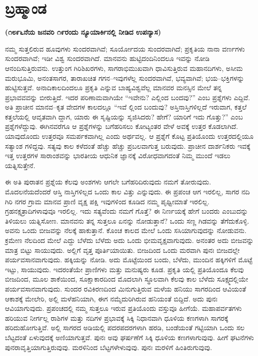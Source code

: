 \chapter{ಬ್ರಹ್ಮಾಂಡ}

\centerline{\textbf{(೧೮೯೬ನೆಯ ಜನವರಿ ೧೯ರಂದು ನ್ಯೂಯಾರ್ಕಿನಲ್ಲಿ ನೀಡಿದ ಉಪನ್ಯಾಸ)}}

ನಮ್ಮ ಸುತ್ತಲಿರುವ ಹೂವುಗಳು ಸುಂದರವಾಗಿವೆ; ಸೂರ್ಯೋದಯ ಸುಂದರವಾಗಿದೆ; ಪ್ರಕೃತಿಯ ನಾನಾ ವರ್ಣಗಳು ಸುಂದರವಾಗಿವೆ; ಇಡೀ ವಿಶ್ವ ಸುಂದರವಾಗಿದೆ. ಮಾನವನು ಹುಟ್ಟಿದಂದಿನಿಂದಲೂ ಇವನ್ನು ನೋಡಿ ಆನಂದಿಸುತ್ತಿರುವನು. ಉತ್ತುಂಗ ಗಿರಿಶಿಖರಗಳು, ಸಾಗರಾಭಿಮುಖವಾಗಿ ಧಾವಿಸುತ್ತಿರುವ ಮಹಾನದಿಗಳು, ಅಸೀಮ ಮರುಭೂಮಿ, ಅನಂತಸಾಗರ, ತಾರಾಖಚಿತ ಗಗನ–ಇವುಗಳೆಲ್ಲ ಸುಂದರವಾಗಿವೆ, ಭವ್ಯವಾಗಿವೆ; ಭಯ–ಭಕ್ತಿಗಳನ್ನು ಹುಟ್ಟಿಸುತ್ತವೆ. ಅನಾದಿಕಾಲದಿಂದಲೂ ಪ್ರಕೃತಿ ಎನ್ನುವ ಬಾಹ್ಯವಿಶ್ವವೆಲ್ಲ ಮಾನವರ ಮನಸ್ಸಿನ ಮೇಲೆ ತನ್ನ ಪ್ರಭಾವವವನ್ನು ಬೀರುತ್ತಿದೆ. ಇದರ ಪರಿಣಾಮವಾಗಿಯೇ “ಇವೇನು? ಎಲ್ಲಿಂದ ಬಂದವು?” ಎಂಬ ಪ್ರಶ್ನೆಗಳು ಎದ್ದಿವೆ. ಅತಿ ಪ್ರಾಚೀನ ಮಾನವ–ಕೃತ ವೇದಗಳ ಕಾಲದಲ್ಲೂ “ಇವೆ ಲ್ಲಿಂದ ಬಂದುವು? ಅಸ್ತಿನಾಸ್ತಿಗಳಿಲ್ಲದೆ ಇರುವಾಗ, ಕತ್ತಲೆ ಕತ್ತಲೆಯಲ್ಲಿ ಆವೃತವಾಗಿ ದ್ದಾಗ, ಯಾರು ಈ ಸೃಷ್ಟಿಯನ್ನು ಸೃಜಿಸಿದರು? ಹೇಗೆ? ಯಾರಿಗೆ ಇದು ಗೊತ್ತು?” ಎಂಬ ಪ್ರಶ್ನೆಗಳೆದ್ದುವು. ಈಗಿನವರೆಗೂ ಆ ಪ್ರಶ್ನೆಗಳನ್ನು ಬಗೆಹರಿಸಲು ಕೋಟ್ಯಂತರ ವೇಳೆ ಅವಕ್ಕೆ ಉತ್ತರ ಕೊಡಲಾಗಿದೆ. ಯಾವುದೊಂದು ಉತ್ತರವೂ ಸಮರ್ಪಕವಾಗಿಲ್ಲ ಎಂದು ಅರ್ಥವಲ್ಲ. ಆ ಪ್ರಶ್ನೆಗೆ ಕೊಟ್ಟ ಪ್ರತಿಯೊಂದು ಉತ್ತರದಲ್ಲಿಯೂ ಸತ್ಯಾಂಶ ಗಳಿದ್ದವು. ಸತ್ಯವು ಕಾಲ ಕಳೆದಂತೆ ಹೆಚ್ಚು ಹೆಚ್ಚು ಪ್ರಬಲವಾಗುತ್ತ ಬರುವುದು. ಪ್ರಾಚೀನ ದಾರ್ಶನಿಕರು ಇವಕ್ಕೆ ಇತ್ತ ಉತ್ತರಗಳ ಸಾರಾಂಶವನ್ನು ಭಾರತೀಯ ಆಧುನಿಕ ಜ್ಞಾನಕ್ಕೆ ವಿರೋಧವಾಗದಂತೆ ನಿಮ್ಮ ಮುಂದೆ ಇಡಲು ಯತ್ನಿಸುತ್ತೇನೆ.

ಈ ಅತಿ ಪುರಾತನ ಪ್ರಶ್ನೆಯ ಕೆಲವು ಅಂಶಗಳು ಆಗಲೇ ಬಗೆಹರಿದಿರುವುದು ನಮಗೆ ತೋರುವುದು. ಮೊದಲನೆಯದೆಂದರೆ ಆಸ್ತಿ ನಾಸ್ತಿಗಳಿಲ್ಲದ ಒಂದು ಕಾಲ ವಿತ್ತು ಎನ್ನುವುದು. ಈ ಪ್ರಪಂಚ ಆಗ ಇರಲಿಲ್ಲ, ಸಾಗರ ನದಿ ಗಿರಿ ನಗರ ಗ್ರಾಮ ಮಾನವ ಪ್ರಾಣಿ ವೃಕ್ಷ ಪಕ್ಷಿ ಇವುಗಳಿಂದ ಕೂಡಿದ ನಮ್ಮ ಪೃಥ್ವೀಮಾತೆ ಇರಲಿಲ್ಲ. ಗ್ರಹನಕ್ಷತ್ರಾದಿಗಳಾವುವೂ ಇರಲಿಲ್ಲ. ಇದು ಸತ್ಯವೆಂದು ನಮಗೆ ಗೊತ್ತೆ? ಈ ನಿರ್ಣಯಕ್ಕೆ ಹೇಗೆ ಬಂದರು ಎಂಬುದನ್ನು ತಿಳಿಯಲು ಯತ್ನಿಸೋಣ. ಮಾನವನು ತನ್ನ ಸುತ್ತಲೂ ಏನನ್ನು ನೋಡುತ್ತಾನೆ? ಒಂದು ಸಣ್ಣ ಗಿಡವನ್ನು ತೆಗೆದುಕೊಳ್ಳಿ. ಅವನು ಒಂದು ಬೀಜವನ್ನು ನೆಲಕ್ಕೆ ಹಾಕುತ್ತಾನೆ. ಕೊಂಚ ಕಾಲದ ಮೇಲೆ ಒಂದು ಸಸಿಯಾಗುವುದನ್ನು ನೋಡುವನು. ಕ್ರಮೇಣ ನೆಲದಿಂದ ಮೇಲೆ ಎದ್ದು ಬೆಳೆದು ಬೆಳೆದು ಅದು ಒಂದು ಭೀಮವೃಕ್ಷವಾಗುವುದು. ಅನಂತರ ಅದು ಬೀಜವನ್ನು ಮಾತ್ರ ಬಿಟ್ಟು ಸಾಯುವುದು. ಅಲ್ಲಿಗೆ ವೃತ್ತ ಪೂರ್ತಿಯಾಯಿತು. ಬೀಜದಿಂದ ಒಂದು ಮರವಾಗಿ ಪುನಃ ಬೀಜದಲ್ಲೇ ಪರ್ಯವಸಾನವಾಗುವುದು. ಹಕ್ಕಿಯನ್ನು ನೋಡಿ. ಅದು ಮೊಟ್ಟೆಯಿಂದ ಬಂದು, ಬೆಳೆದು, ಮುಂದಿನ ಹಕ್ಕಿಗಳಿಗೆ ಮೊಟ್ಟೆ ಇಟ್ಟು, ಸಾಯುವುದು. ಇದರಂತೆಯೇ ಪ್ರಾಣಿಗಳು ಮತ್ತು ಮನುಷ್ಯರು ಕೂಡ. ಪ್ರಕೃತಿ ಯಲ್ಲಿ ಪ್ರತಿಯೊಂದೂ ಕೆಲವು ಬೀಜದಿಂದ, ಮೂಲ ಶಾಕೆಯಿಂದ, ಸೂಕ್ಷಾಕಾರದಿಂದ ಮೊದಲಾಗಿ ಸ್ಥೂಲವಾಗಿ ಕೆಲವು ಕಾಲ ಬೆಳೆದು ಸೂಕ್ಷ್ಮದಲ್ಲಿಯೇ ಪರ್ಯವಸಾನವಾಗುವುದು. ಸುಂದರ ರವಿಕಿರಣದಿಂದ ಮಿನುಗುತ್ತಿರುವ ಮಳೆಯ ಹನಿಯು ಸಾಗರದಿಂದ ಆವಿಯಂತೆ ಆಕಾಶಕ್ಕೆ ಮೇಲೇರಿ, ಅಲ್ಲಿ ಮಳೆಹನಿಯಾಗಿ, ಈಗ ನಮ್ಮೆದುರಿಗಿರುವ ಹನಿಯಂತೆ ಬಿದ್ದಿದೆ. ಅದು ಪುನಃ ಆವಿಯಾಗುವುದು. ಪ್ರಪಂಚದಲ್ಲಿ ನಮ್ಮ ಸುತ್ತಲೂ ಇರುವ ಪ್ರತಿಯೊಂದು ವಸ್ತುವೂ ಹೀಗೆಯೆ. ಮಹಾಪರ್ವತಗಳು ಹರಿಯುವ ನೀರ್ಗಲ್ಲ ರಾಶಿಗಳ ಮತ್ತು ನದಿಗಳ ಪ್ರಭಾವಕ್ಕೆ ಸಿಕ್ಕಿ ನಿಧಾನವಾಗಿ ಧೂಳಿಯ ಕಣಗಳಾಗಿ ಸಾಗರಕ್ಕೆ ಹರಿದುಹೋಗುತ್ತಿವೆ. ಅಲ್ಲಿ ಸಾಗರದ ಅಡಿಯಲ್ಲಿ ಪದರಪದರಗಳಾಗಿ ಹರಡಿ, ಬಂಡೆಯಂತೆ ಗಟ್ಟಿಯಾಗಿ ಒಂದು ಸಲ ಬೆಟ್ಟದಂತೆ ಏಳುವುದಕ್ಕೆ ಅಣಿಯಾಗುತ್ತವೆ. ಪುನಃ ಅವು ಘರ್ಷಣೆಗೆ ಸಿಕ್ಕಿ ಧೂಳಿಯ ಕಣಗಳಾಗುವುವು. ಹೀಗೆ ಘಟನೆಗಳು ಪುನರಾವೃತ್ತಿಯಾಗುತ್ತಿರುವುವು. ಮರಳಿನಿಂದ ಬೆಟ್ಟಗಳೇಳುವುವು. ಪುನಃ ಮರಳಿಗೆ ಹಿಂತಿರುಗುವುವು.

